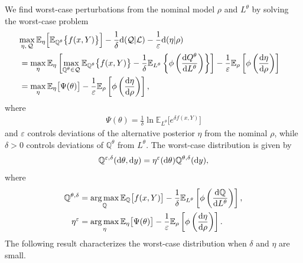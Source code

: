 \documentclass[11pt,reqno,letter]{amsart}
\theoremstyle{plain}
\theoremstyle{definition}
\numberwithin{equation}{section}
\numberwithin{theorem}{section}
\numberwithin{table}{section}
\numberwithin{figure}{section}
\DeclareMathOperator*{\argmax}{arg\,max}
\begin{document}
We find worst-case perturbations from the nominal model $\rho$ and $L^\theta$ by solving the worst-case problem
\begin{align*}
\lefteqn{\max_{{\eta, \,{\mathcal Q}} } {\mathbb E}_\eta \Big[{\mathbb E}_{{\mathbb Q}^{\theta}} \big\{f(x, Y)\big\}\Big] - \frac{1}{\delta}{\rm d}({\mathcal Q}| {\mathcal L}) - \frac{1}{\varepsilon} {\rm d}(\eta | \rho)} \\
& = \max_\eta  {\mathbb E}_\eta\left[\max_{{{\mathbb Q}^\theta\in {\mathcal Q}} }{\mathbb E}_{{\mathbb Q}^{\theta}} \big\{f(x, Y)\big\} - \frac{1}{\delta}{\mathbb E}_{L^\theta}\left\{\phi\left(\frac{{\rm d}Q^\theta}{{\rm d}L^\theta}\right)\right\}\right] - \frac{1}{\varepsilon}{\mathbb E}_\rho \left[\phi\left(\frac{{\rm d}\eta}{{\rm d}\rho}\right)\right]  \\
& = \max_\eta  {\mathbb E}_\eta \big[\Psi(\theta)\big] - \frac{1}{\varepsilon}{\mathbb E}_\rho \left[\phi\left(\frac{{\rm d}\eta}{{\rm d}\rho}\right)\right],
\end{align*}
where
\begin{eqnarray*}
\Psi(\theta) =\frac{1}{\delta} \ln {\mathbb E}_{L^{\theta}} \Big[e^{\delta f(x, Y)}\Big]
\end{eqnarray*}
and $\varepsilon$ controls deviations of the alternative posterior $\eta$ from the nominal $\rho$, while $\delta>0$ controls deviations of ${\mathbb Q}^\theta$ from $L^\theta$.
The worst-case distribution is given by
\begin{eqnarray*}
{\mathbb Q}^{\varepsilon,\delta}({\rm d}\theta, {\rm d}y) = \eta^\varepsilon({\rm d}\theta) {\mathbb Q}^{\theta,\delta}({\rm d}y),
\end{eqnarray*}
where
\begin{align*}
{\mathbb Q}^{\theta, \delta}  & =   \argmax_{\mathbb Q}{\mathbb E}_{{\mathbb Q}} \big[f(x, Y) \big] - \frac{1}{\delta}{\mathbb E}_{L^\theta}\left[\phi\left(\frac{{\rm d}{\mathbb Q}}{{\rm d}L^\theta}\right)\right],\\
\eta^\varepsilon & =  \argmax_\eta  {\mathbb E}_\eta \big[\Psi(\theta)\big] - \frac{1}{\varepsilon}{\mathbb E}_\rho \left[\phi\left(\frac{{\rm d}\eta}{{\rm d}\rho}\right)\right].
\end{align*}
The following result characterizes the worst-case distribution when $\delta$ and $\eta$ are small.
\end{document}
